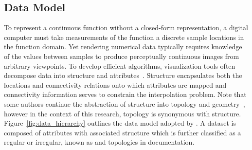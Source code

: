\subsection{Data Model}
To represent a continuous function without a closed-form
representation, a digital computer must take measurements of the
function a discrete sample locations in the function domain. Yet
rendering numerical data typically requires knowledge of the values
between samples to produce perceptually continuous images from
arbitrary viewpoints. To develop efficient algorithms, visualization
tools often decompose data into structure and
attributes~\cite{vtk}. Structure encapsulates both the locations and
connectivity relations onto which attributes are mapped and
connectivity information serves to constrain the interpolation
problem. Note that some authors continue the abstraction of structure
into topology and geometry~\cite{weiler}, however in the context of
this research, topology is synonymous with
structure. Figure~\ref{fig:data_hierarchy} outlines the data model
adopted by \sciwms{}. A dataset is composed of attributes with
associated structure which is further classified as a regular or
irregular, known as {\bf \cgrid{} } and {\bf \ugrid{}} topologies in
\sciwms{} documentation.
